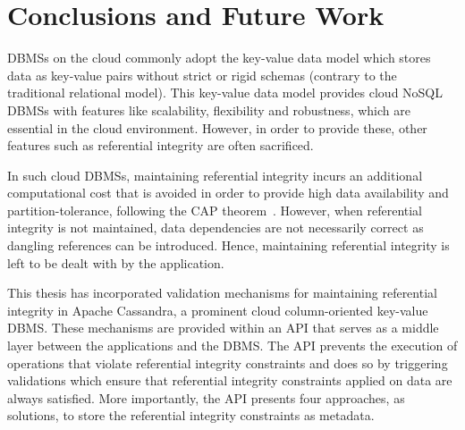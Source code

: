 \chapter{Conclusions and Future Work}

\acp{DBMS} on the cloud commonly adopt the key-value data model which stores
data as key-value pairs without strict or rigid schemas (contrary to the traditional
relational model).
This key-value data model provides cloud \ac{NoSQL} \acp{DBMS} with features
like scalability, flexibility and robustness, which are essential in the
cloud environment.  However, in order to provide these, other features  such as
referential integrity  are often sacrificed.

In such cloud \acp{DBMS}, maintaining referential integrity incurs an additional
computational cost that is avoided in order to provide high data availability
and partition-tolerance, following the CAP theorem~\citep{Brewer,Stonebraker}.
However, when referential integrity is not maintained, data dependencies are not
necessarily correct as dangling references can be introduced. Hence, 
maintaining referential integrity is left to be dealt with by the application.


This thesis has incorporated validation
mechanisms for maintaining referential integrity  in Apache Cassandra,  a
prominent cloud column-oriented key-value \ac{DBMS}. These mechanisms are
provided within an \ac{API} that serves as a middle layer between the
applications and the \ac{DBMS}. The \ac{API} prevents the execution of
operations that violate referential integrity constraints and does so by
triggering validations which ensure that referential integrity constraints
applied on data are always satisfied.
More importantly, the \ac{API} presents four approaches, as solutions, to store
the referential integrity constraints as metadata.

